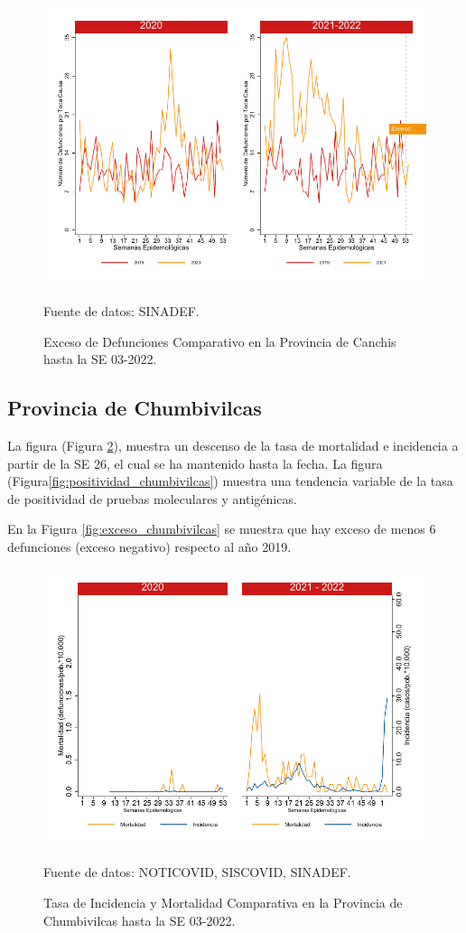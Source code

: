 \documentclass[12pt,a4paper,openany]{book}
\begin{document}
		\begin{figure}[h]
			\caption{Exceso de Defunciones Comparativo en la Provincia de Canchis hasta la SE 03-2022.}\label{fig:exceso_canchis}
			\begin{center}
				\includegraphics[width=0.7\linewidth]{../figuras/exceso_5}
			\end{center}
			{\footnotesize {Fuente de datos: SINADEF.}}
		\end{figure}
		
		\clearpage
		
		\subsection*{Provincia de Chumbivilcas}
		\noindent La figura (Figura \ref{fig:inc_mort_chumbivilcas}),  muestra un descenso de la tasa de mortalidad e incidencia a partir de la SE 26, el cual se ha mantenido hasta la fecha. 
		\noindent La figura (Figura\ref{fig:positividad_chumbivilcas}) muestra una tendencia variable de la tasa de positividad de pruebas moleculares y antigénicas.
		
		En la Figura \ref{fig:exceso_chumbivilcas} se muestra que hay exceso de menos 6 defunciones (exceso negativo) respecto al año 2019.
		
		\begin{figure}[h]
			\caption{Tasa de Incidencia y Mortalidad Comparativa en la Provincia de Chumbivilcas hasta la SE 03-2022.}\label{fig:inc_mort_chumbivilcas}
			\begin{center}
				\includegraphics[width=0.7\linewidth]{../figuras/incidencia_mortalidad_20_21_6}
			\end{center}
			{\footnotesize {Fuente de datos: NOTICOVID, SISCOVID, SINADEF.}}
		\end{figure}
		
\end{document}
